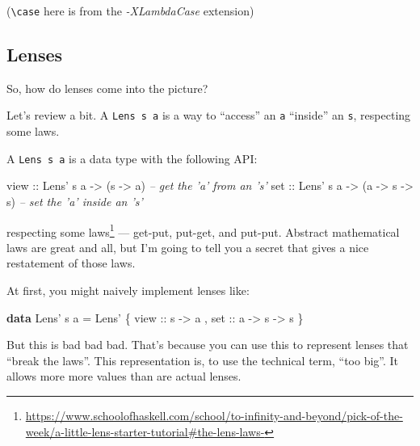 \documentclass[]{article}
\newenvironment{Shaded}{}{}
\newcommand{\CommentTok}[1]{\textcolor[rgb]{0.38,0.63,0.69}{\textit{#1}}}
\newcommand{\DataTypeTok}[1]{\textcolor[rgb]{0.56,0.13,0.00}{#1}}
\newcommand{\FunctionTok}[1]{\textcolor[rgb]{0.02,0.16,0.49}{#1}}
\newcommand{\KeywordTok}[1]{\textcolor[rgb]{0.00,0.44,0.13}{\textbf{#1}}}
\newcommand{\NormalTok}[1]{#1}
\newcommand{\OtherTok}[1]{\textcolor[rgb]{0.00,0.44,0.13}{#1}}
\renewcommand{\href}[2]{#2\footnote{\url{#1}}}
\begin{document}
(\texttt{\textbackslash{}case} here is from the \emph{-XLambdaCase} extension)

\hypertarget{lenses}{%
\subsection{Lenses}\label{lenses}}

So, how do lenses come into the picture?

Let's review a bit. A \texttt{Lens\textquotesingle{}\ s\ a} is a way to
``access'' an \texttt{a} ``inside'' an \texttt{s}, respecting some laws.

A \texttt{Lens\textquotesingle{}\ s\ a} is a data type with the following API:

\begin{Shaded}
\begin{Highlighting}[]
\OtherTok{view ::} \DataTypeTok{Lens'}\NormalTok{ s a }\OtherTok{->}\NormalTok{ (s }\OtherTok{->}\NormalTok{ a)                }\CommentTok{-- get the 'a' from an 's'}
\OtherTok{set  ::} \DataTypeTok{Lens'}\NormalTok{ s a }\OtherTok{->}\NormalTok{ (a }\OtherTok{->}\NormalTok{ s }\OtherTok{->}\NormalTok{ s)           }\CommentTok{-- set the 'a' inside an 's'}
\end{Highlighting}
\end{Shaded}

respecting
\href{https://www.schoolofhaskell.com/school/to-infinity-and-beyond/pick-of-the-week/a-little-lens-starter-tutorial\#the-lens-laws-}{some
laws} --- get-put, put-get, and put-put. Abstract mathematical laws are great
and all, but I'm going to tell you a secret that gives a nice restatement of
those laws.

At first, you might naively implement lenses like:

\begin{Shaded}
\begin{Highlighting}[]
\KeywordTok{data} \DataTypeTok{Lens'}\NormalTok{ s a }\FunctionTok{=} \DataTypeTok{Lens'}\NormalTok{ \{}\OtherTok{ view ::}\NormalTok{ s }\OtherTok{->}\NormalTok{ a}
\NormalTok{                       ,}\OtherTok{ set  ::}\NormalTok{ a }\OtherTok{->}\NormalTok{ s }\OtherTok{->}\NormalTok{ s}
\NormalTok{                       \}}
\end{Highlighting}
\end{Shaded}

But this is bad bad bad. That's because you can use this to represent lenses
that ``break the laws''. This representation is, to use the technical term,
``too big''. It allows more more values than are actual lenses.
\end{document}
